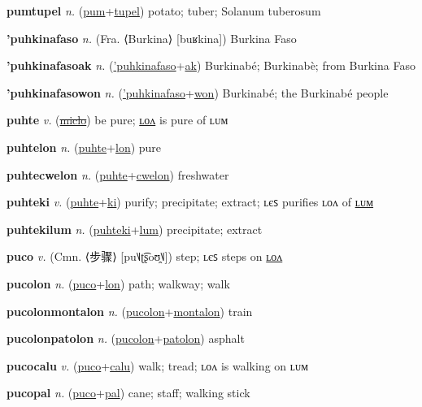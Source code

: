 \textbf{\hypertarget{pumtupel}{pumtupel}} \textit{n.} (\hyperlink{pum}{pum}+\allowbreak \hyperlink{tupel}{tupel})
potato; tuber; Solanum tuberosum

\textbf{\hypertarget{'puhkinafaso}{'puhkinafaso}} \textit{n.} (Fra. ⟨Burkina⟩ [buʁkina])
Burkina Faso

\textbf{\hypertarget{'puhkinafasoak}{'puhkinafasoak}} \textit{n.} (\hyperlink{'puhkinafaso}{'puhkinafaso}+\allowbreak \hyperlink{ak}{ak})
Burkinabé; Burkinabè; from Burkina Faso

\textbf{\hypertarget{'puhkinafasowon}{'puhkinafasowon}} \textit{n.} (\hyperlink{'puhkinafaso}{'puhkinafaso}+\allowbreak \hyperlink{won}{won})
Burkinabé; the Burkinabé people

\textbf{\hypertarget{puhte}{puhte}} \textit{v.} (\hyperlink{miclo}{\sout{miclo}})
be pure; \hyperlink{puhtelon}{ʟᴏᴧ} is pure of ʟᴜᴍ

\textbf{\hypertarget{puhtelon}{puhtelon}} \textit{n.} (\hyperlink{puhte}{puhte}+\allowbreak \hyperlink{lon}{lon})
pure

\textbf{\hypertarget{puhtecwelon}{puhtecwelon}} \textit{n.} (\hyperlink{puhte}{puhte}+\allowbreak \hyperlink{cwelon}{cwelon})
freshwater

\textbf{\hypertarget{puhteki}{puhteki}} \textit{v.} (\hyperlink{puhte}{puhte}+\allowbreak \hyperlink{ki}{ki})
purify; precipitate; extract; ʟєꜱ purifies ʟᴏᴧ of \hyperlink{puhtekilum}{ʟᴜᴍ}

\textbf{\hypertarget{puhtekilum}{puhtekilum}} \textit{n.} (\hyperlink{puhteki}{puhteki}+\allowbreak \hyperlink{lum}{lum})
precipitate; extract

\textbf{\hypertarget{puco}{puco}} \textit{v.} (Cmn. ⟨{\chinese{}步骤}⟩ [pu˥˩ʈ͡ʂoʊ̯˥˩])
step; ʟєꜱ steps on \hyperlink{pucolon}{ʟᴏᴧ}

\textbf{\hypertarget{pucolon}{pucolon}} \textit{n.} (\hyperlink{puco}{puco}+\allowbreak \hyperlink{lon}{lon})
path; walkway; walk

\textbf{\hypertarget{pucolonmontalon}{pucolonmontalon}} \textit{n.} (\hyperlink{pucolon}{pucolon}+\allowbreak \hyperlink{montalon}{montalon})
train

\textbf{\hypertarget{pucolonpatolon}{pucolonpatolon}} \textit{n.} (\hyperlink{pucolon}{pucolon}+\allowbreak \hyperlink{patolon}{patolon})
asphalt

\textbf{\hypertarget{pucocalu}{pucocalu}} \textit{v.} (\hyperlink{puco}{puco}+\allowbreak \hyperlink{calu}{calu})
walk; tread; ʟᴏᴧ is walking on ʟᴜᴍ

\textbf{\hypertarget{pucopal}{pucopal}} \textit{n.} (\hyperlink{puco}{puco}+\allowbreak \hyperlink{pal}{pal})
cane; staff; walking stick

